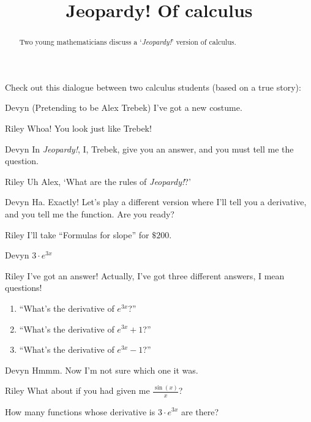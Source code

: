 \documentclass{ximera}
\title[Break-Ground:]{Jeopardy! Of calculus}
\begin{document}
\begin{abstract}
  Two young mathematicians discuss a `\textit{Jeopardy!}' version of calculus.
\end{abstract}
\maketitle

Check out this dialogue between two calculus students (based on a true story):

\begin{dialogue}
\item[Devyn] (Pretending to be Alex Trebek) I've got a new costume.
\item[Riley] Whoa! You look just like Trebek!
\item[Devyn] In \textit{Jeopardy!}, I, Trebek, give you an answer, and you must tell me the question.
\item[Riley] Uh Alex, `What are the rules of \textit{Jeopardy!}?'
\item[Devyn] Ha. Exactly! Let's play a different version where I'll
  tell you a derivative, and you tell me the function.  Are you ready?
\item[Riley] I'll take ``Formulas for slope'' for $\$200$.
\item[Devyn] $3\cdot e^{3x}$  
\item[Riley] I've got an answer!  Actually, I've got three different
  answers, I mean questions!
  \begin{enumerate}
  \item ``What's the derivative of $e^{3x}$?''
  \item ``What's the derivative of $e^{3x}+1$?''
  \item ``What's the derivative of $e^{3x}-1$?''
  \end{enumerate}
\item[Devyn] Hmmm. Now I'm not sure which one it was.
\item[Riley] What about if you had given me $\frac{\sin(x)}{x}$?
\end{dialogue}


\begin{problem}
  How many functions whose derivative is $3\cdot e^{3x}$ are there?
  \begin{prompt}
  \begin{multipleChoice}
  \end{multipleChoice}
  \end{prompt}
\end{problem}
\end{document}
